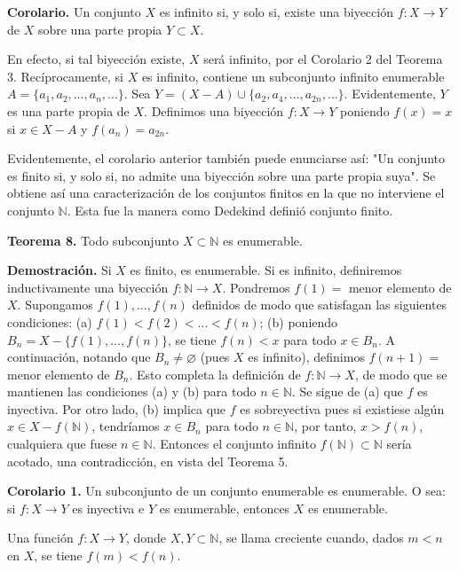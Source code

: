 \documentclass[12pt,oneside]{book}
\begin{document}
\textbf{Corolario.} Un conjunto \( X \) es infinito si, y solo si, existe una biyección \( f: X \to Y \) de \( X \) sobre una parte propia \( Y \subset X \).

En efecto, si tal biyección existe, \( X \) será infinito, por el Corolario 2 del Teorema 3. Recíprocamente, si \( X \) es infinito, contiene un subconjunto infinito enumerable \( A = \{a_1, a_2, \dots, a_n, \dots\} \). Sea \( Y = (X - A) \cup \{a_2, a_4, \dots, a_{2n}, \dots\} \). Evidentemente, \( Y \) es una parte propia de \( X \). Definimos una biyección \( f: X \to Y \) poniendo \( f(x) = x \) si \( x \in X - A \) y \( f(a_n) = a_{2n} \).

Evidentemente, el corolario anterior también puede enunciarse así: "Un conjunto es finito si, y solo si, no admite una biyección sobre una parte propia suya". Se obtiene así una caracterización de los conjuntos finitos en la que no interviene el conjunto \( \mathbb{N} \). Esta fue la manera como Dedekind definió conjunto finito.

\textbf{Teorema 8.} Todo subconjunto \( X \subset \mathbb{N} \) es enumerable.

\textbf{Demostración.} Si \( X \) es finito, es enumerable. Si es infinito, definiremos inductivamente una biyección \( f: \mathbb{N} \to X \). Pondremos \( f(1) = \) menor elemento de \( X \). Supongamos \( f(1), \dots, f(n) \) definidos de modo que satisfagan las siguientes condiciones: (a) \( f(1) < f(2) < \dots < f(n) \); (b) poniendo \( B_n = X - \{f(1), \dots, f(n)\} \), se tiene \( f(n) < x \) para todo \( x \in B_n \). A continuación, notando que \( B_n \neq \varnothing \) (pues \( X \) es infinito), definimos \( f(n+1) = \) menor elemento de \( B_n \). Esto completa la definición de \( f: \mathbb{N} \to X \), de modo que se mantienen las condiciones (a) y (b) para todo \( n \in \mathbb{N} \). Se sigue de (a) que \( f \) es inyectiva. Por otro lado, (b) implica que \( f \) es sobreyectiva pues si existiese algún \( x \in X - f(\mathbb{N}) \), tendríamos \( x \in B_n \) para todo \( n \in \mathbb{N} \), por tanto, \( x > f(n) \), cualquiera que fuese \( n \in \mathbb{N} \). Entonces el conjunto infinito \( f(\mathbb{N}) \subset \mathbb{N} \) sería acotado, una contradicción, en vista del Teorema 5.

\textbf{Corolario 1.} Un subconjunto de un conjunto enumerable es enumerable. O sea: si \( f: X \to Y \) es inyectiva e \( Y \) es enumerable, entonces \( X \) es enumerable.

Una función \( f: X \to Y \), donde \( X, Y \subset \mathbb{N} \), se llama creciente cuando, dados \( m < n \) en \( X \), se tiene \( f(m) < f(n) \).
\end{document}
